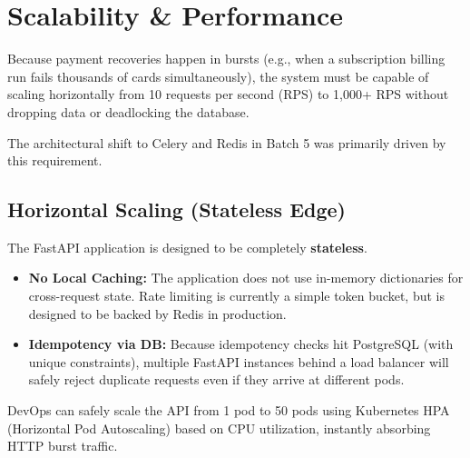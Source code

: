 
\section{Scalability \& Performance}

\begin{tcolorbox}[summarybox={\iconFlow[1.5] Scaling the Recovery Engine}]
\color{textdark}
Because payment recoveries happen in bursts (e.g., when a subscription billing run fails thousands of cards simultaneously), the system must be capable of scaling horizontally from 10 requests per second (RPS) to 1,000+ RPS without dropping data or deadlocking the database.

The architectural shift to Celery and Redis in Batch 5 was primarily driven by this requirement.
\end{tcolorbox}

\vspace{0.8cm}

\subsection{Horizontal Scaling (Stateless Edge)}

The FastAPI application is designed to be completely \textbf{stateless}. 

\begin{itemize}
    \item \textbf{No Local Caching:} The application does not use in-memory dictionaries for cross-request state. Rate limiting is currently a simple token bucket, but is designed to be backed by Redis in production.
    \item \textbf{Idempotency via DB:} Because idempotency checks hit PostgreSQL (with unique constraints), multiple FastAPI instances behind a load balancer will safely reject duplicate requests even if they arrive at different pods.
\end{itemize}

DevOps can safely scale the API from 1 pod to 50 pods using Kubernetes HPA (Horizontal Pod Autoscaling) based on CPU utilization, instantly absorbing HTTP burst traffic.

\vspace{0.8cm}

